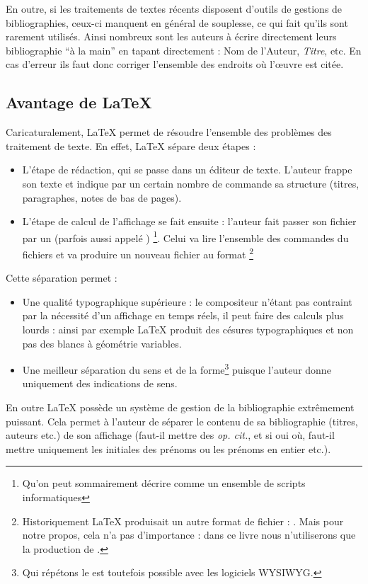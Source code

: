 En outre, si les traitements de textes récents disposent d'outils de gestions de bibliographies, ceux-ci manquent en général de souplesse, ce qui fait qu'ils sont rarement utilisés. Ainsi nombreux sont les auteurs à écrire directement leurs bibliographie \enquote{à la main} en tapant directement : Nom de l'Auteur, \emph{Titre}, etc. En cas d'erreur ils faut donc corriger l'ensemble des endroits où l'œuvre est citée.

\subsection{Avantage de \LaTeX{}}

Caricaturalement, \LaTeX{} permet de résoudre l'ensemble des problèmes des traitement de texte. En effet, \LaTeX{} sépare deux étapes : 

\begin{itemize}
\item L'étape de rédaction, qui se passe dans un éditeur de texte. L'auteur frappe son texte et indique par un certain nombre de commande sa structure (titres, paragraphes, notes de bas de pages).
\item L'étape de calcul de l'affichage se fait ensuite : l'auteur fait passer son fichier par un  (parfois aussi appelé ) \footnote{Qu'on peut sommairement décrire comme un ensemble de scripts informatiques}. Celui va lire l'ensemble des commandes du fichiers et va produire un nouveau fichier au format \footnote{Historiquement \LaTeX{} produisait un autre format de fichier : . Mais pour notre propos, cela n'a pas d'importance : dans ce livre nous n'utiliserons que la production de .}
\end{itemize}

Cette séparation permet :
\begin{itemize}
\item Une qualité typographique supérieure :  le compositeur n'étant pas contraint par la nécessité d'un affichage en temps réels, il peut faire des calculs plus lourds : ainsi par exemple \LaTeX{} produit des césures typographiques et non pas des blancs à géométrie variables.
\item Une meilleur séparation du sens et de la forme\footnote{Qui répétons le est toutefois possible avec les logiciels WYSIWYG.} puisque l'auteur donne uniquement des indications de sens.
\end{itemize}

En outre \LaTeX{} possède un système de gestion de la bibliographie extrêmement puissant. Cela permet à l'auteur de séparer le contenu de sa bibliographie (titres, auteurs etc.) de son affichage (faut-il mettre des \emph{op. cit.}, et si oui où, faut-il mettre uniquement les initiales des prénoms ou les prénoms en entier etc.).

